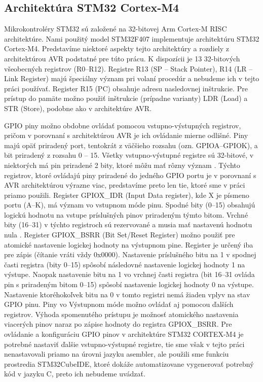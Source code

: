 \subsection{Architektúra STM32 Cortex-M4}
Mikrokontroléry STM32 sú založené na 32-bitovej Arm Cortex-M RISC architektúre. Nami použitý model STM32F407 implementuje architektúru STM32 Cortex-M4. Predstavíme niektoré aspekty tejto architektúry a rozdiely z architektúrou AVR podstatné pre túto prácu. K dispozícii je 13 32-bitových všeobecných registrov (R0--R12). Registre R13 (SP -- Stack Pointer), R14 (LR -- Link Register) majú špeciálny význam pri volaní procedúr \cite{stmInstruction} a nebudeme ich v tejto práci používať. Register R15 (PC) obsahuje adresu nasledovnej inštrukcie. Pre prístup do pamäte možno použiť inštrukcie (prípadne varianty) LDR (Load) a STR (Store), podobne ako v architektúre AVR.

GPIO piny možno obdobne ovládať pomocou vstupno-výstupných registrov, pričom v porovnaní s architektúrou AVR je ich ovládanie mierne odlišné. Piny majú opäť priradený port, tentokrát z väčšieho rozsahu (ozn. GPIOA--GPIOK), a bit priradený z rozsahu 0 -- 15. Všetky vstupno-výstupné registre sú 32-bitové, v niektorých má pin priradené 2 bity, ktoré môžu mať rôzny význam \cite{stmReference}. Týchto registrov, ktoré ovládajú piny priradené do jedného GPIO portu je v porovnaní s AVR architektúrou výrazne viac, predstavíme preto len tie, ktoré sme v práci priamo použili. Register GPIOX\_IDR (Input Data register), kde X je písmeno portu (A--K), má význam vo vstupnom móde pinu. Spodné bity (0--15) obsahujú logickú hodnotu na vstupe príslušných pinov priradeným týmto bitom. Vrchné bity (16--31) v týchto registroch sú rezervované a musia mať nastavenú hodnotu nula \cite{stmReference}. Register GPIOX\_BSRR (Bit Set/Reset Register) možno použiť pre atomické nastavenie logickej hodnoty na výstupnom pine. Register je určený iba pre zápis (čítanie vráti vždy 0x0000). Nastavenie príslušného bitu na 1 v spodnej časti registra (bity 0--15) spôsobí následovné nastavenie logickej hodnoty 1 na výstupe. Naopak nastavenie bitu na 1 vo vrchnej časti registra (bit 16--31 ovláda pin s priradeným bitom 0--15) spôsobí nastavenie logickej hodnoty 0 na výstupe. Nastavenie ktoréhokoľvek bitu na 0 v tomto registri nemá žiaden vplyv na stav GPIO pinu. Piny vo Výstupnom móde možno ovládať aj pomocou ďalších registrov. Výhoda spomenutého prístupu je možnosť atomického nastavenia viacerých pinov naraz po zápise hodnoty do registra GPIOX\_BSRR. Pre ovládanie a konfiguráciu GPIO pinov v architektúre STM32 CORTEX-M4 je potrebné nastaviť ďalšie vstupno-výstupné registre, tie sme však v tejto práci nenastavovali priamo na úrovni jazyku asembler, ale použili sme funkciu prostredia STM32CubeIDE, ktoré dokáže automatizovane vygenerovať potrebný kód v jazyku C, preto ich nebudeme uvádzať.

